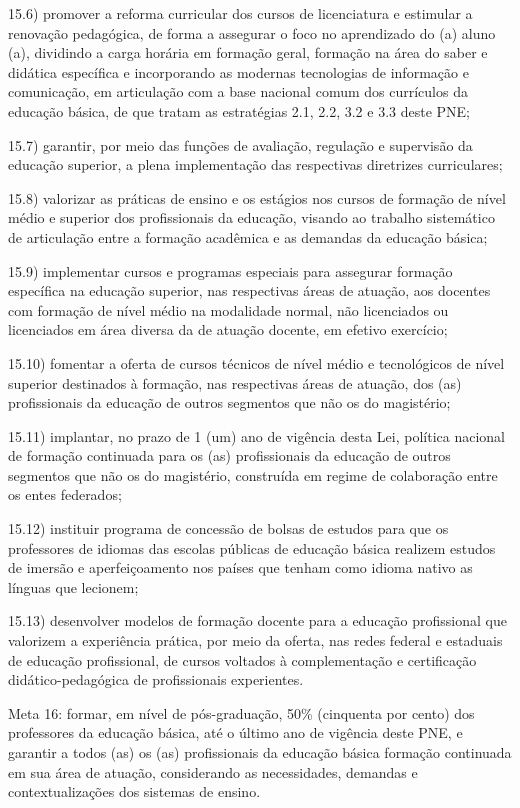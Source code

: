 \documentclass[
]{book}
\begin{document}
15.6) promover a reforma curricular dos cursos de licenciatura e estimular a renovação pedagógica, de forma a assegurar o foco no aprendizado do (a) aluno (a), dividindo a carga horária em formação geral, formação na área do saber e didática específica e incorporando as modernas tecnologias de informação e comunicação, em articulação com a base nacional comum dos currículos da educação básica, de que tratam as estratégias 2.1, 2.2, 3.2 e 3.3 deste PNE;

15.7) garantir, por meio das funções de avaliação, regulação e supervisão da educação superior, a plena implementação das respectivas diretrizes curriculares;

15.8) valorizar as práticas de ensino e os estágios nos cursos de formação de nível médio e superior dos profissionais da educação, visando ao trabalho sistemático de articulação entre a formação acadêmica e as demandas da educação básica;

15.9) implementar cursos e programas especiais para assegurar formação específica na educação superior, nas respectivas áreas de atuação, aos docentes com formação de nível médio na modalidade normal, não licenciados ou licenciados em área diversa da de atuação docente, em efetivo exercício;

15.10) fomentar a oferta de cursos técnicos de nível médio e tecnológicos de nível superior destinados à formação, nas respectivas áreas de atuação, dos (as) profissionais da educação de outros segmentos que não os do magistério;

15.11) implantar, no prazo de 1 (um) ano de vigência desta Lei, política nacional de formação continuada para os (as) profissionais da educação de outros segmentos que não os do magistério, construída em regime de colaboração entre os entes federados;

15.12) instituir programa de concessão de bolsas de estudos para que os professores de idiomas das escolas públicas de educação básica realizem estudos de imersão e aperfeiçoamento nos países que tenham como idioma nativo as línguas que lecionem;

15.13) desenvolver modelos de formação docente para a educação profissional que valorizem a experiência prática, por meio da oferta, nas redes federal e estaduais de educação profissional, de cursos voltados à complementação e certificação didático-pedagógica de profissionais experientes.

Meta 16: formar, em nível de pós-graduação, 50\% (cinquenta por cento) dos professores da educação básica, até o último ano de vigência deste PNE, e garantir a todos (as) os (as) profissionais da educação básica formação continuada em sua área de atuação, considerando as necessidades, demandas e contextualizações dos sistemas de ensino.
\end{document}
